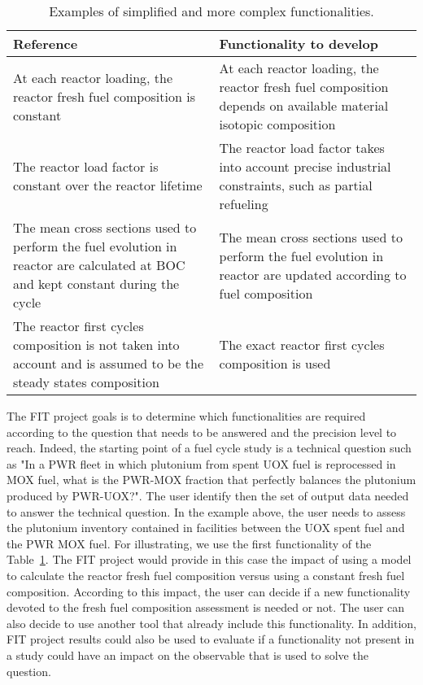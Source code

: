 \begin{table}[h]
\centering
\begin{tabular}{ |p{}|p{}| }
  \hline
  Reference & Functionality to develop \\
  \hline
  At each reactor loading, the reactor fresh fuel composition is constant & At each reactor loading, the reactor fresh fuel composition depends on available material isotopic composition \\
  \hline
  The reactor load factor is constant over the reactor lifetime & The reactor load factor takes into account precise industrial constraints, such as partial refueling \\
  \hline
  The mean cross sections used to perform the fuel evolution in reactor are calculated at BOC and kept constant during the cycle & The mean cross sections used to perform the fuel evolution in reactor are updated according to fuel composition \\
  \hline
  The reactor first cycles composition is not taken into account and is assumed to be the steady states composition & The exact reactor first cycles composition is used \\
  \hline
\end{tabular}
\label{Tab:Funct}
\caption{Examples of simplified and more complex functionalities.}
\end{table}

The FIT project goals is to determine which functionalities are required
according to the question that needs to be answered and the precision level to
reach. Indeed, the starting point of a fuel cycle study is a technical question
such as "In a PWR fleet in which plutonium from spent UOX fuel is reprocessed in
MOX fuel, what is the PWR-MOX fraction that perfectly balances the plutonium
produced by PWR-UOX?". The user identify then the set of output data needed to
answer the technical question. In the example above, the user needs to assess
the plutonium inventory contained in facilities between the UOX spent fuel and
the PWR MOX fuel. For illustrating, we use the first functionality of the
Table~\ref{Tab:Funct}. The FIT project would provide in this case the impact of
using a model to calculate the reactor fresh fuel composition versus using a
constant fresh fuel composition. According to this impact, the user can decide
if a new functionality devoted to the fresh fuel composition assessment is
needed or not. The user can also decide to use another tool that already include
this functionality. In addition, FIT project results could also be used to
evaluate if a functionality not present in a study could have an impact on the
observable that is used to solve the question.


